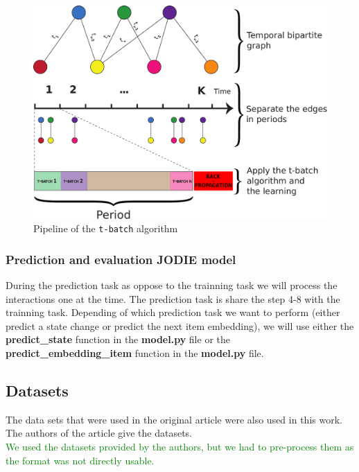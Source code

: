 \begin{figure}[htbp]
    \centering
    \includegraphics[width=.7\textwidth]{image/pipeline_t-batch.pdf}
    \caption{Pipeline of the \texttt{t-batch} algorithm}
    \label{pipeline_t-batch}
\end{figure}

\subsubsection{Prediction and evaluation JODIE model}
During the prediction task as oppose to the trainning task we will  process the interactions one at the time. The prediction task is share the step 4-8 with the trainning task. Depending of which prediction task we want to perform (either predict a state change or predict the next item embedding), we will use either the \textbf{predict\_state} function in the \textbf{model.py} file or the \textbf{predict\_embedding\_item} function in the \textbf{model.py} file.

\subsection{Datasets}
 
The data sets that were used in the original article were also used in this work. The authors of the article give the datasets. \\

\textcolor{green}{We used the datasets provided by the authors, but we had to pre-process them as the format was not directly usable.} \\

